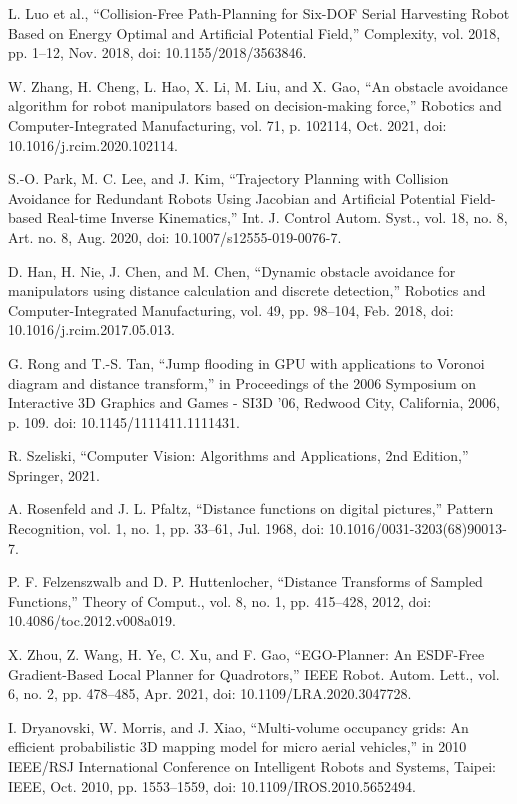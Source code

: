 \documentclass[letterpaper, 10 pt, conference]{ieeeconf}  %
\begin{document}
\begin{thebibliography}{99}
 L. Luo et al., “Collision-Free Path-Planning for Six-DOF Serial Harvesting Robot Based on Energy Optimal and Artificial Potential Field,” Complexity, vol. 2018, pp. 1–12, Nov. 2018, doi: 10.1155/2018/3563846.

 W. Zhang, H. Cheng, L. Hao, X. Li, M. Liu, and X. Gao, “An obstacle avoidance algorithm for robot manipulators based on decision-making force,” Robotics and Computer-Integrated Manufacturing, vol. 71, p. 102114, Oct. 2021, doi: 10.1016/j.rcim.2020.102114.

 S.-O. Park, M. C. Lee, and J. Kim, “Trajectory Planning with Collision Avoidance for Redundant Robots Using Jacobian and Artificial Potential Field-based Real-time Inverse Kinematics,” Int. J. Control Autom. Syst., vol. 18, no. 8, Art. no. 8, Aug. 2020, doi: 10.1007/s12555-019-0076-7.

 D. Han, H. Nie, J. Chen, and M. Chen, “Dynamic obstacle avoidance for manipulators using distance calculation and discrete detection,” Robotics and Computer-Integrated Manufacturing, vol. 49, pp. 98–104, Feb. 2018, doi: 10.1016/j.rcim.2017.05.013.

 G. Rong and T.-S. Tan, “Jump flooding in GPU with applications to Voronoi diagram and distance transform,” in Proceedings of the 2006 Symposium on Interactive 3D Graphics and Games - SI3D ’06, Redwood City, California, 2006, p. 109. doi: 10.1145/1111411.1111431.

 R. Szeliski, “Computer Vision: Algorithms and Applications, 2nd Edition,” Springer, 2021.

 A. Rosenfeld and J. L. Pfaltz, “Distance functions on digital pictures,” Pattern Recognition, vol. 1, no. 1, pp. 33–61, Jul. 1968, doi: 10.1016/0031-3203(68)90013-7.

 P. F. Felzenszwalb and D. P. Huttenlocher, “Distance Transforms of Sampled Functions,” Theory of Comput., vol. 8, no. 1, pp. 415–428, 2012, doi: 10.4086/toc.2012.v008a019.

 X. Zhou, Z. Wang, H. Ye, C. Xu, and F. Gao, “EGO-Planner: An ESDF-Free Gradient-Based Local Planner for Quadrotors,” IEEE Robot. Autom. Lett., vol. 6, no. 2, pp. 478–485, Apr. 2021, doi: 10.1109/LRA.2020.3047728.

 I. Dryanovski, W. Morris, and J. Xiao, “Multi-volume occupancy grids: An efficient probabilistic 3D mapping model for micro aerial vehicles,” in 2010 IEEE/RSJ International Conference on Intelligent Robots and Systems, Taipei: IEEE, Oct. 2010, pp. 1553–1559, doi: 10.1109/IROS.2010.5652494.



\end{thebibliography}
\end{document}
